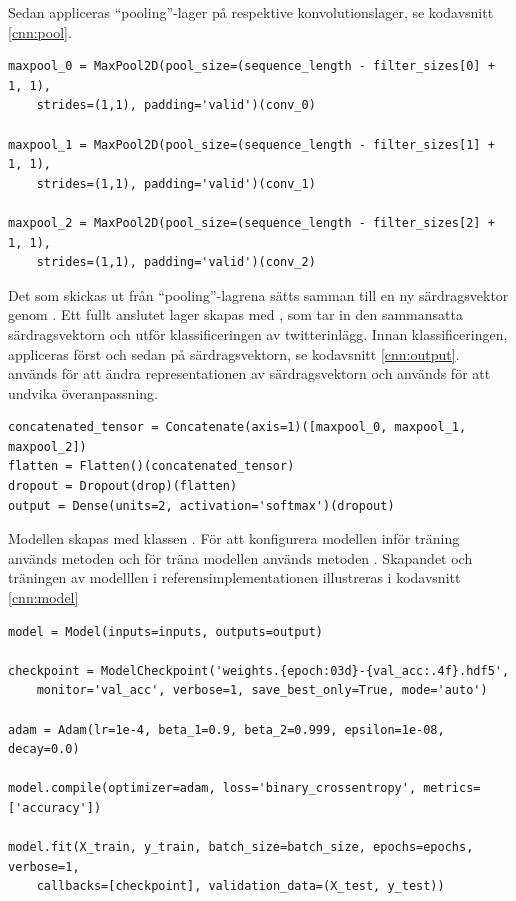 \documentclass{kaumasters} %
\begin{document}
Sedan appliceras “pooling”-lager på respektive konvolutionslager, se kodavsnitt \ref{cnn:pool}. 

\begin{lstlisting}[style=mypython,caption={Kod för att skapa och applicera ''pooling''-lager på respektive konvolutionslager.},label=cnn:pool]
maxpool_0 = MaxPool2D(pool_size=(sequence_length - filter_sizes[0] + 1, 1),
    strides=(1,1), padding='valid')(conv_0)
	
maxpool_1 = MaxPool2D(pool_size=(sequence_length - filter_sizes[1] + 1, 1), 
    strides=(1,1), padding='valid')(conv_1)
	
maxpool_2 = MaxPool2D(pool_size=(sequence_length - filter_sizes[2] + 1, 1), 
    strides=(1,1), padding='valid')(conv_2)
\end{lstlisting}

Det som skickas ut från “pooling”-lagrena sätts samman till en ny särdragsvektor genom . Ett fullt anslutet lager skapas med  \cite{impcnn:006}, som tar in den sammansatta särdragsvektorn och utför klassificeringen av twitterinlägg. Innan klassificeringen, appliceras först  \cite{impcnn:006} och sedan  \cite{impcnn:006} på särdragsvektorn, se kodavsnitt \ref{cnn:output}.  används för att ändra representationen av särdragsvektorn och  används för att undvika överanpassning. 

\begin{lstlisting}[style=mypython,caption={Kod för att sätta samman en ny särdragsvektor och koppla in ett fullt anslutet lager.},label=cnn:output]
concatenated_tensor = Concatenate(axis=1)([maxpool_0, maxpool_1, maxpool_2])
flatten = Flatten()(concatenated_tensor)
dropout = Dropout(drop)(flatten)
output = Dense(units=2, activation='softmax')(dropout)
\end{lstlisting}

Modellen skapas med klassen  \cite{impcnn:008}. För att konfigurera modellen inför träning används metoden  \cite{impcnn:008} och för träna modellen används metoden  \cite{impcnn:008}. Skapandet och träningen av modelllen i referensimplementationen illustreras i kodavsnitt \ref{cnn:model}

\begin{lstlisting}[style=mypython,caption={Kod för att skapa och träna CNN-klassificeraren.},label=cnn:model]
model = Model(inputs=inputs, outputs=output)

checkpoint = ModelCheckpoint('weights.{epoch:03d}-{val_acc:.4f}.hdf5', 
    monitor='val_acc', verbose=1, save_best_only=True, mode='auto')

adam = Adam(lr=1e-4, beta_1=0.9, beta_2=0.999, epsilon=1e-08, decay=0.0)

model.compile(optimizer=adam, loss='binary_crossentropy', metrics=['accuracy'])

model.fit(X_train, y_train, batch_size=batch_size, epochs=epochs, verbose=1, 
    callbacks=[checkpoint], validation_data=(X_test, y_test))
\end{lstlisting}
\end{document}
